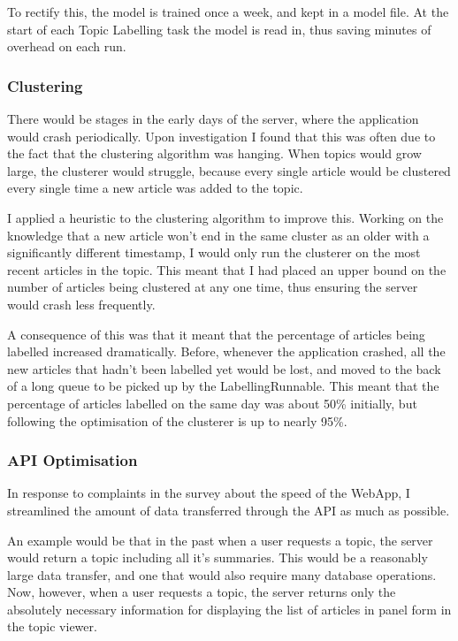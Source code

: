 \documentclass[12pt]{article}
\begin{document}
To rectify this, the model is trained once a week, and kept in a model file. At the start of each Topic Labelling task the model is read in, thus saving minutes of overhead on each run.

\label{topicmodellingoptimisation}

\subsubsection{Clustering}

There would be stages in the early days of the server, where the application would crash periodically. Upon investigation I found that this was often due to the fact that the clustering algorithm was hanging. When topics would grow large, the clusterer would struggle, because every single article would be clustered every single time a new article was added to the topic.

I applied a heuristic to the clustering algorithm to improve this. Working on the knowledge that a new article won't end in the same cluster as an older with a significantly different timestamp, I would only run the clusterer on the most recent articles in the topic. This meant that I had placed an upper bound on the number of articles being clustered at any one time, thus ensuring the server would crash less frequently.

A consequence of this was that it meant that the percentage of articles being labelled increased dramatically. Before, whenever the application crashed, all the new articles that hadn't been labelled yet would be lost, and moved to the back of a long queue to be picked up by the LabellingRunnable. This meant that the percentage of articles labelled on the same day was about 50\% initially, but following the optimisation of the clusterer is up to nearly 95\%. 

\subsubsection{API Optimisation}

In response to complaints in the survey about the speed of the WebApp, I streamlined the amount of data transferred through the API as much as possible. 

An example would be that in the past when a user requests a topic, the server would return a topic including all it's summaries. This would be a reasonably large data transfer, and one that would also require many database operations. Now, however, when a user requests a topic, the server returns only the absolutely necessary information for displaying the list of articles in panel form in the topic viewer. 
\end{document}
